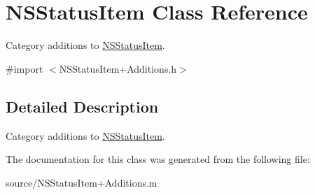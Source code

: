 \hypertarget{class_n_s_status_item}{
\section{NSStatusItem Class Reference}
\label{class_n_s_status_item}
}


Category additions to \hyperlink{class_n_s_status_item}{NSStatusItem}.  


{\ttfamily \#import $<$NSStatusItem+Additions.h$>$}

\subsection{Detailed Description}
Category additions to \hyperlink{class_n_s_status_item}{NSStatusItem}. 

The documentation for this class was generated from the following file:\begin{DoxyCompactItemize}
\item 
source/NSStatusItem+Additions.m\end{DoxyCompactItemize}
